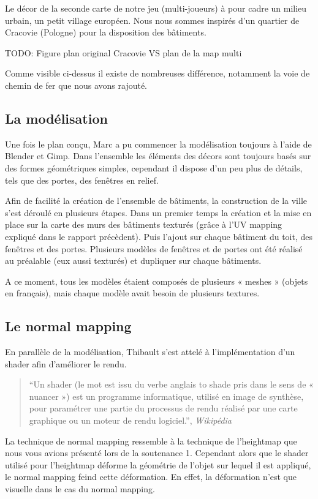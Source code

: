 \documentclass[11pt]{report}
\begin{document}
Le décor de la seconde carte de notre jeu (multi-joueurs) à pour cadre un milieu urbain, un petit village européen. Nous nous sommes inspirés d’un quartier de Cracovie (Pologne) pour la disposition des bâtiments.

TODO: Figure plan original Cracovie VS plan de la map multi

Comme visible ci-dessus il existe de nombreuses différence, notamment la voie de chemin de fer que nous avons rajouté.

\subsection{La modélisation}

Une fois le plan conçu, Marc a pu commencer la modélisation toujours à l’aide de Blender et Gimp.
Dans l’ensemble les éléments des décors sont toujours basés sur des formes géométriques simples, cependant il dispose d’un peu plus de détails, tels que des portes, des fenêtres en relief.

Afin de facilité la création de l’ensemble de bâtiments, la construction de la ville s’est déroulé en plusieurs étapes. Dans un premier temps la création et la mise en place sur la carte des murs des bâtiments texturés (grâce à l’UV mapping expliqué dans le rapport précèdent). Puis l’ajout sur chaque bâtiment du toit, des fenêtres et des portes. Plusieurs modèles de fenêtres et de portes ont été réalisé au préalable (eux aussi texturés) et dupliquer sur chaque bâtiments.

A ce moment, tous les modèles étaient composés de plusieurs « meshes » (objets en français), mais  chaque modèle avait besoin de plusieurs textures.

\subsection{Le normal mapping}

En parallèle de la modélisation, Thibault s’est attelé à l’implémentation d’un shader afin d’améliorer le rendu.

\begin{quote}
``Un shader (le mot est issu du verbe anglais to shade pris dans le sens de « nuancer ») est un programme informatique, utilisé en image de synthèse, pour paramétrer une partie du processus de rendu réalisé par une carte graphique ou un moteur de rendu logiciel.'', \emph{Wikipédia}
\end{quote}

La technique de normal mapping ressemble à la technique de l’heightmap que nous vous avions présenté lors de la soutenance 1. Cependant alors que le shader utilisé pour l’heightmap déforme la géométrie de l’objet sur lequel il est appliqué, le normal mapping feind cette déformation. En effet, la déformation n’est que visuelle dans le cas du normal mapping.
\end{document}
